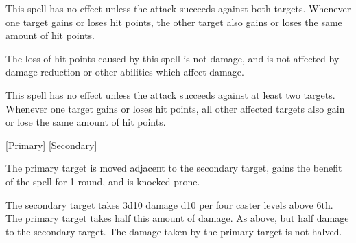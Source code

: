 \begin{spellheader}
\end{spellheader}
\begin{spelleffects}
    \spelldur{\durshort}
    \spellspecial This spell has no effect unless the attack succeeds against both targets.
    \spellsuccess Whenever one target gains or loses hit points, the other target also gains or loses the same amount of hit points.
\end{spelleffects}
\begin{spellfooter}
    \spellnotes The loss of hit points caused by this spell is not damage, and is not affected by damage reduction or other abilities which affect damage.
\end{spellfooter}

\begin{spellheader}
    \spelldur{\durshort}
\end{spellheader}
\begin{spelleffects}
    \spellspecial This spell has no effect unless the attack succeeds against at least two targets.
    \spellsuccess Whenever one target gains or loses hit points, all other affected targets also gain or lose the same amount of hit points.
\end{spelleffects}
\begin{spellfooter}

\end{spellfooter}

\begin{spellheader}
    \spellrng{\rngclose}
    [Primary]
    [Secondary]
\end{spellheader}
\begin{spelleffects}
    \spelleffect The primary target is moved adjacent to the secondary target, gains the benefit of the  spell for 1 round, and is knocked prone.
    \begin{spellmargin}
        \spellsuccess The secondary target takes 3d10 damage \add d10 per four caster levels above 6th. The primary target takes half this amount of damage.
        \spellfailure As above, but half damage to the secondary target. The damage taken by the primary target is not halved.
    \end{spellmargin}
\end{spelleffects}
\begin{spellfooter}

\end{spellfooter}

